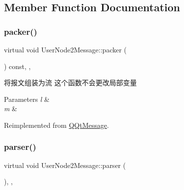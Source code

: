 \subsection{Member Function Documentation}
\mbox{\label{class_user_node2_message_a4dfa598c963421cfecc686cd9d94724c}} 
\subsubsection{\texorpdfstring{packer()}{packer()}}
{\footnotesize\ttfamily virtual void User\+Node2\+Message\+::packer (\begin{DoxyParamCaption}\item[{Q\+Byte\+Array \&}]{ }\end{DoxyParamCaption}) const\hspace{0.3cm}{\ttfamily [inline]}, {\ttfamily [override]}, {\ttfamily [virtual]}}



将报文组装为流 这个函数不会更改局部变量 


\begin{DoxyParams}{Parameters}
{\em l} & \\
\hline
{\em m} & \\
\hline
\end{DoxyParams}


Reimplemented from \mbox{\hyperlink{class_q_qt_message_af1885c2c3628495808dca66ee8d72e14}{Q\+Qt\+Message}}.

\mbox{\label{class_user_node2_message_a306cfbfe2a1e9c226f16d5b76331c3bd}} 
\subsubsection{\texorpdfstring{parser()}{parser()}}
{\footnotesize\ttfamily virtual void User\+Node2\+Message\+::parser (\begin{DoxyParamCaption}\item[{const Q\+Byte\+Array \&}]{ }\end{DoxyParamCaption})\hspace{0.3cm}{\ttfamily [inline]}, {\ttfamily [override]}, {\ttfamily [virtual]}}



